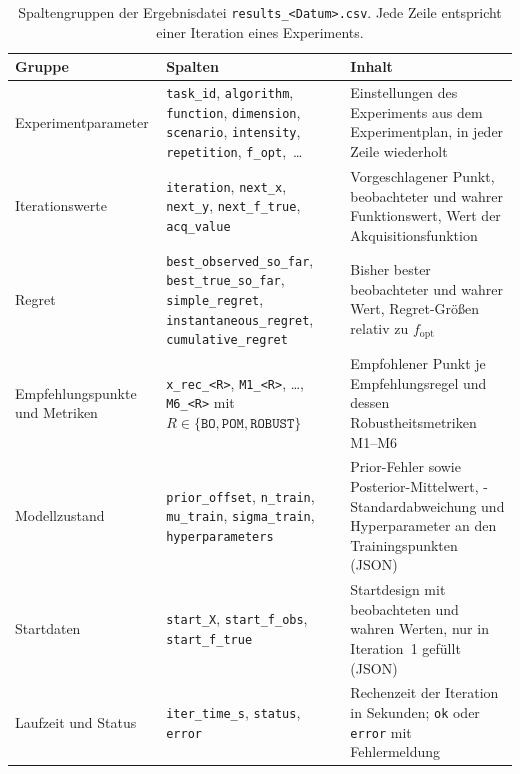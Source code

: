 \begin{table}[htbp]
  \centering
  \small
  \caption{Spaltengruppen der Ergebnisdatei \texttt{results\_<Datum>.csv}. Jede Zeile entspricht einer Iteration eines Experiments.}
  \label{tab:csv-spalten}
  \begin{tabularx}{\textwidth}{@{}>{\raggedright\arraybackslash}p{2.6cm} >{\raggedright\arraybackslash}p{5.2cm} >{\raggedright\arraybackslash}X@{}}
    \toprule
    \textbf{Gruppe} & \textbf{Spalten} & \textbf{Inhalt} \\
    \midrule
    Experiment\-parameter
      & \texttt{task\_id}, \texttt{algorithm}, \texttt{function}, \texttt{dimension}, \texttt{scenario}, \texttt{intensity}, \texttt{repetition}, \texttt{f\_opt},~\dots
      & Einstellungen des Experiments aus dem Experimentplan, in jeder Zeile wiederholt \\
    \addlinespace
    Iterations\-werte
      & \texttt{iteration}, \texttt{next\_x}, \texttt{next\_y}, \texttt{next\_f\_true}, \texttt{acq\_value}
      & Vorgeschlagener Punkt, beobachteter und wahrer Funktionswert, Wert der Akquisitionsfunktion \\
    \addlinespace
    Regret
      & \texttt{best\_observed\_so\_far}, \texttt{best\_true\_so\_far}, \texttt{simple\_regret}, \texttt{instantaneous\_regret}, \texttt{cumulative\_regret}
      & Bisher bester beobachteter und wahrer Wert, Regret-Größen relativ zu $f_{\mathrm{opt}}$ \\
    \addlinespace
    Empfehlungs\-punkte und Metriken
      & \texttt{x\_rec\_<R>}, \texttt{M1\_<R>}, \dots, \texttt{M6\_<R>} \newline
        mit $R \in \{\texttt{BO}, \texttt{POM}, \texttt{ROBUST}\}$
      & Empfohlener Punkt je Empfehlungsregel und dessen Robustheitsmetriken M1--M6 \\
    \addlinespace
    Modell\-zustand
      & \texttt{prior\_offset}, \texttt{n\_train}, \texttt{mu\_train}, \texttt{sigma\_train}, \texttt{hyperparameters}
      & Prior-Fehler sowie Posterior-Mittelwert, -Standardabweichung und Hyperparameter an den Trainingspunkten (JSON) \\
    \addlinespace
    Startdaten
      & \texttt{start\_X}, \texttt{start\_f\_obs}, \texttt{start\_f\_true}
      & Startdesign mit beobachteten und wahren Werten, nur in Iteration~1 gefüllt (JSON) \\
    \addlinespace
    Laufzeit und Status
      & \texttt{iter\_time\_s}, \texttt{status}, \texttt{error}
      & Rechenzeit der Iteration in Sekunden; \texttt{ok} oder \texttt{error} mit Fehlermeldung \\
    \bottomrule
  \end{tabularx}
\end{table}
